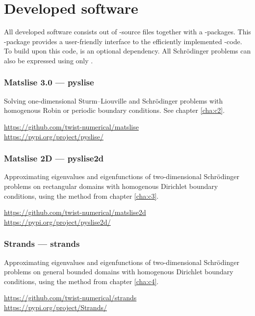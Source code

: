 


\chapter*{Developed software}

All developed software consists out of \cpp{}-source files together with a \lpython{}-packages. This \lpython{}-package provides a user-friendly interface to the efficiently implemented \cpp{}-code. To build upon this code, \lpython{} is an optional dependency. All Schrödinger problems can also be expressed using only \cpp{}.

\subsection*{Matslise 3.0 --- pyslise}

Solving one-dimensional Sturm--Liouville and Schrödinger problems with homogenous Robin or periodic boundary conditions. See chapter \ref{cha:c2}.

\url{https://github.com/twist-numerical/matslise} \\
\url{https://pypi.org/project/pyslise/}


\subsection*{Matslise 2D --- pyslise2d}

Approximating eigenvalues and eigenfunctions of two-dimensional Schrödinger problems on rectangular domains with homogenous Dirichlet boundary conditions, using the method from chapter \ref{cha:c3}.

\url{https://github.com/twist-numerical/matslise2d} \\
\url{https://pypi.org/project/pyslise2d/}


\subsection*{Strands --- strands}

Approximating eigenvalues and eigenfunctions of two-dimensional Schrödinger problems on general bounded domains with homogenous Dirichlet boundary conditions, using the method from chapter \ref{cha:c4}.

\url{https://github.com/twist-numerical/strands} \\
\url{https://pypi.org/project/Strands/}


\stopchapter
